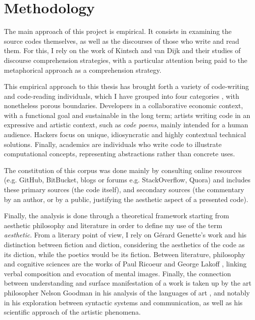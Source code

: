 \documentclass{article}
\begin{document}
\section{Methodology}

The main approach of this project is empirical. It consists in examining the source codes themselves, as well as the discourses of those who write and read them. For this, I rely on the work of Kintsch and van Dijk and their studies of discourse comprehension strategies, with a particular attention being paid to the metaphorical approach as a comprehension strategy.

This empirical approach to this thesis has brought forth a variety of code-writing and code-reading individuals, which I have grouped into four categories \citep{hayes_cultures_2017}, with nonetheless porous boundaries. Developers in a collaborative economic context, with a functional goal and sustainable in the long term; artists writing code in an expressive and artistic context, such as \emph{code poems}, mainly intended for a human audience. Hackers focus on unique, idiosyncratic and highly contextual technical solutions. Finally, academics are individuals who write code to illustrate computational concepts, representing abstractions rather than concrete uses.

The constitution of this corpus was done mainly by consulting online resources (e.g. GitHub, BitBucket, blogs or forums e.g. StackOverflow, Quora) and includes these primary sources (the code itself), and secondary sources (the commentary by an author, or by a public, justifying the aesthetic aspect of a presented code).

Finally, the analysis is done through a theoretical framework starting from aesthetic philosophy and literature in order to define my use of the term \emph{aesthetic}. From a literary point of view, I rely on Gérard Genette's work and his distinction between fiction and diction, considering the aesthetics of the code as its diction, while the poetics would be its fiction. Between literature, philosophy and cognitive sciences are the works of Paul Ricoeur \citep{ricoeur_rule_2003} and George Lakoff \citep{lakoff_metaphors_1980}, linking verbal composition and evocation of mental images. Finally, the connection between understanding and surface manifestation of a work is taken up by the art philosopher Nelson Goodman in his analysis of the languages of art \citep{goodman_languages_1976}, and notably in his exploration between syntactic systems and communication, as well as his scientific approach of the artistic phenomena.
\end{document}
